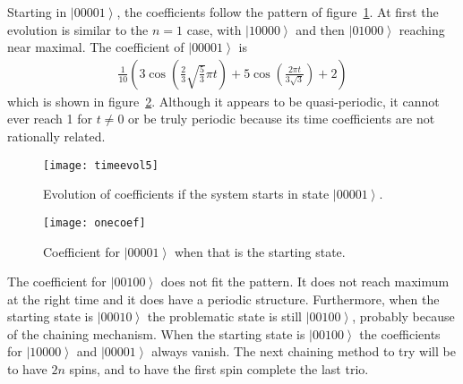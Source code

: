 \documentclass[11pt]{article}
\newcommand{\ket}[1]{\left|#1\right\rangle}
\begin{document}
Starting in $\ket{00001}$, the coefficients follow the pattern of figure~\ref{fig:timeevol5}. At first the evolution is similar to the $n=1$ case, with $\ket{10000}$ and then $\ket{01000}$ reaching near maximal. The coefficient of $\ket{00001}$ is 
\begin{align}
\frac{1}{10} \left(3 \cos \left(\frac{2}{3} \sqrt{\frac{5}{3}} \pi  t\right)+5 \cos \left(\frac{2 \pi  t}{3 \sqrt{3}}\right)+2\right)
\end{align} 
which is shown in figure~\ref{fig:onecoef}. Although it appears to be quasi-periodic, it cannot ever reach 1 for $t\ne 0$ or be truly periodic because its time coefficients are not rationally related.

\begin{figure}
	\centering
	\texttt{[image: timeevol5]}
	\caption{Evolution of coefficients if the system starts in state $\ket{00001}$.}
	\label{fig:timeevol5}
\end{figure}

\begin{figure}
	\centering
	\texttt{[image: onecoef]}
	\caption{Coefficient for $\ket{00001}$ when that is the starting state.}
	\label{fig:onecoef}
\end{figure}

The coefficient for $\ket{00100}$ does not fit the pattern. It does not reach maximum at the right time and it does have a periodic structure. Furthermore, when the starting state is $\ket{00010}$ the problematic state is still $\ket{00100}$, probably because of the chaining mechanism. When the starting state is $\ket{00100}$ the coefficients for $\ket{10000}$ and $\ket{00001}$ always vanish. The next chaining method to try will be to have $2n$ spins, and to have the first spin complete the last trio.
\end{document}
